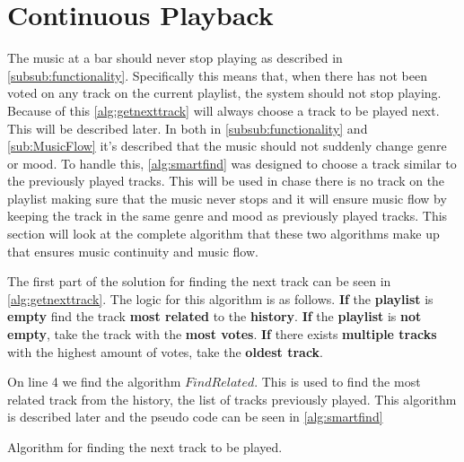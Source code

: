 \section{Continuous Playback}
\label{sec:algorithm}
The music at a bar should never stop playing as described in
\cref{subsub:functionality}. Specifically this means that, when there has not been voted
on any track on the current playlist, the system should not stop
playing. Because of this \cref{alg:getnexttrack} will always choose a track to be played next. This will be described later. In both in \cref{subsub:functionality} and \cref{sub:MusicFlow} it's described that the music should not suddenly change genre or mood. To handle this, \cref{alg:smartfind} was designed to
choose a track similar to the previously played tracks. This will be used in chase there is no track on the playlist making sure that the music never stops and it will ensure music flow by keeping the track in the same genre and mood as previously played tracks. This section will look at the complete algorithm that these two algorithms make up that ensures music continuity and music flow.

The first part of the solution for finding the next track can be seen in \cref{alg:getnexttrack}. The logic for this algorithm is as follows. \textbf{If} the \textbf{playlist} is \textbf{empty} find the track \textbf{most related} to the \textbf{history}. \textbf{If} the \textbf{playlist} is \textbf{not empty}, take the track with the \textbf{most votes}. \textbf{If} there exists \textbf{multiple tracks} with the highest amount of votes, take the \textbf{oldest track}.

On line 4 we find the algorithm $FindRelated$. This is used to find the most related track from the history, the list of tracks previously played. This algorithm is described later and the pseudo code can be seen in \cref{alg:smartfind}

\begin{algorithm}[hbtp]
\caption{Algorithm for finding the next track to be played.}\label{alg:getnexttrack}
\begin{algorithmic}[1]
		\EndIf{}
			\Else{} 
					\EndIf{}
				\EndIf{}
			\EndIf{}
		\EndFor{}
	\EndFunction{}
\end{algorithmic}
\end{algorithm}

